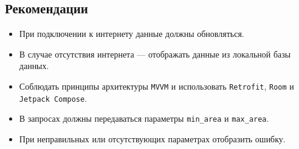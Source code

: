 \subsection{Рекомендации}
\begin{itemize}
  \item При подключении к интернету данные должны обновляться.
  \item В случае отсутствия интернета — отображать данные из локальной базы данных.
  \item Соблюдать принципы архитектуры \texttt{MVVM} и использовать \texttt{Retrofit}, \texttt{Room} и \texttt{Jetpack Compose}.
  \item В запросах должны передаваться параметры \texttt{min\_area} и \texttt{max\_area}.
  \item При неправильных или отсутствующих параметрах отобразить ошибку.
\end{itemize}
